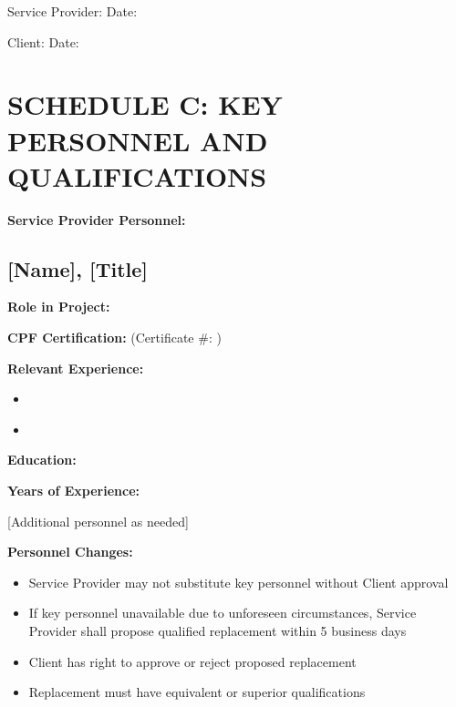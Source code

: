 \documentclass[11pt,a4paper]{article}
\begin{document}
Service Provider: \underline{\hspace{5cm}} Date: \underline{\hspace{3cm}}

Client: \underline{\hspace{5cm}} Date: \underline{\hspace{3cm}}

\newpage

\section*{SCHEDULE C: KEY PERSONNEL AND QUALIFICATIONS}

\textbf{Service Provider Personnel:}

\subsection*{[Name], [Title]}

\textbf{Role in Project:} \underline{\hspace{8cm}}

\textbf{CPF Certification:} \underline{\hspace{6cm}} (Certificate \#: \underline{\hspace{4cm}})

\textbf{Relevant Experience:}
\begin{itemize}
\item[] \underline{\hspace{12cm}}
\item[] \underline{\hspace{12cm}}
\end{itemize}

\textbf{Education:} \underline{\hspace{10cm}}

\textbf{Years of Experience:} \underline{\hspace{4cm}}

\vspace{1em}

[Additional personnel as needed]

\vspace{2em}

\textbf{Personnel Changes:}

\begin{itemize}
\item Service Provider may not substitute key personnel without Client approval
\item If key personnel unavailable due to unforeseen circumstances, Service Provider shall propose qualified replacement within 5 business days
\item Client has right to approve or reject proposed replacement
\item Replacement must have equivalent or superior qualifications
\end{itemize}
\end{document}
